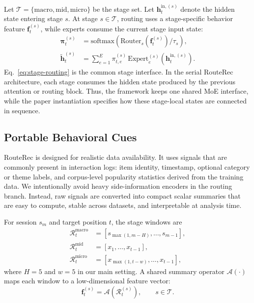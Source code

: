 \documentclass[sigconf,review,anonymous]{acmart}
\begin{document}
Let $\mathcal{T}=\{\mathrm{macro},\mathrm{mid},\mathrm{micro}\}$ be the stage set. Let $\mathbf{h}^{\mathrm{in},(s)}_t$ denote the hidden state entering stage $s$. At stage $s \in \mathcal{T}$, routing uses a stage-specific behavior feature $\mathbf{f}^{(s)}_t$, while experts consume the current stage input state:
\begin{align}
\boldsymbol{\pi}^{(s)}_t
&=
\mathrm{softmax}\!\left(\mathrm{Router}_s(\mathbf{f}^{(s)}_t)/\tau_s\right), \\
\tilde{\mathbf{h}}^{(s)}_t
&=
\sum_{e=1}^{E}\pi^{(s)}_{t,e}\,\mathrm{Expert}^{(s)}_e(\mathbf{h}^{\mathrm{in},(s)}_t).
\label{eq:stage-routing}
\end{align}
Eq.~\eqref{eq:stage-routing} is the common stage interface. In the serial RouteRec architecture, each stage consumes the hidden state produced by the previous attention or routing block. Thus, the framework keeps one shared MoE interface, while the paper instantiation specifies how these stage-local states are connected in sequence.

\subsection{Portable Behavioral Cues}
\label{sec:feature-construction}

RouteRec is designed for realistic data availability. It uses signals that are commonly present in interaction logs: item identity, timestamp, optional category or theme labels, and corpus-level popularity statistics derived from the training data. We intentionally avoid heavy side-information encoders in the routing branch. Instead, raw signals are converted into compact scalar summaries that are easy to compute, stable across datasets, and interpretable at analysis time.

For session $s_m$ and target position $t$, the stage windows are
\begin{align}
\mathcal{R}^{\mathrm{macro}}_t &= [s_{\max(1,m-H)},\dots,s_{m-1}], \\
\mathcal{R}^{\mathrm{mid}}_t &= [x_1,\dots,x_{t-1}], \\
\mathcal{R}^{\mathrm{micro}}_t &= [x_{\max(1,t-w)},\dots,x_{t-1}],
\end{align}
where $H=5$ and $w=5$ in our main setting. A shared summary operator $\mathcal{A}(\cdot)$ maps each window to a low-dimensional feature vector:
\[
\mathbf{f}^{(s)}_t=\mathcal{A}(\mathcal{R}^{(s)}_t),\qquad s\in\mathcal{T}.
\]
\end{document}
